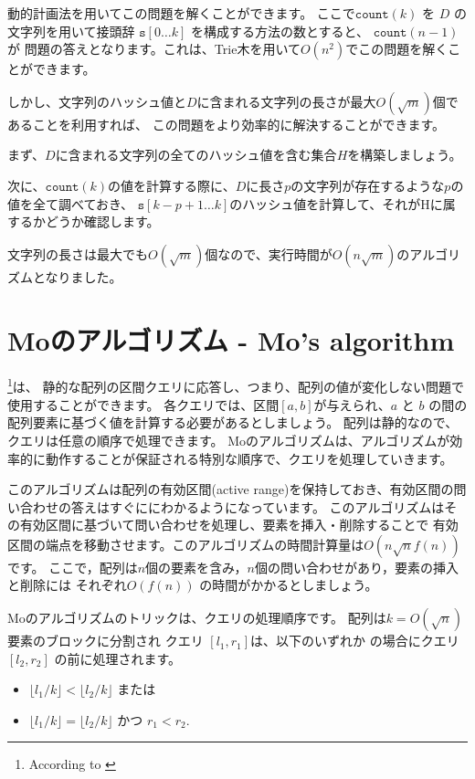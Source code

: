 動的計画法を用いてこの問題を解くことができます。
ここで$\texttt{count}(k)$ を $D$ の文字列を用いて接頭辞 $\texttt{s}[0 \ldots k]$ を構成する方法の数とすると、
$\texttt{count}(n-1)$が
問題の答えとなります。これは、Trie木を用いて$O(n^2)$でこの問題を解くことができます。

しかし、文字列のハッシュ値と$D$に含まれる文字列の長さが最大$O(\sqrt m)$個であることを利用すれば、
この問題をより効率的に解決することができます。

まず、$D$に含まれる文字列の全てのハッシュ値を含む集合$H$を構築しましょう。

次に、$\texttt{count}(k)$の値を計算する際に、$D$に長さ$p$の文字列が存在するような$p$の値を全て調べておき、
$\texttt{s}[k-p+1 \ldots k]$のハッシュ値を計算して、それがHに属するかどうか確認します。

文字列の長さは最大でも$O(\sqrt m)$個なので、実行時間が$O(n \sqrt m)$のアルゴリズムとなりました。

\section{Moのアルゴリズム - Mo's algorithm}


\footnote{According to \cite{cod15}}は、
静的な配列の区間クエリに応答し、つまり、配列の値が変化しない問題で使用することができます。
各クエリでは、区間$[a,b]$が与えられ、$a$ と $b$ の間の配列要素に基づく値を計算する必要があるとしましょう。
配列は静的なので、クエリは任意の順序で処理できます。
Moのアルゴリズムは、アルゴリズムが効率的に動作することが保証される特別な順序で、クエリを処理していきます。

このアルゴリズムは配列の有効区間(active range)を保持しておき、有効区間の問い合わせの答えはすぐににわかるようになっています。
このアルゴリズムはその有効区間に基づいて問い合わせを処理し、要素を挿入・削除することで
有効区間の端点を移動させます。このアルゴリズムの時間計算量は$O(n \sqrt n f(n))$ です。
ここで，配列は$n$個の要素を含み，$n$個の問い合わせがあり，要素の挿入と削除には それぞれ$O(f(n))$ の時間がかかるとしましょう。

Moのアルゴリズムのトリックは、クエリの処理順序です。
配列は$k=O(\sqrt n)$要素のブロックに分割され
クエリ $[l_1,r_1]$は、以下のいずれか の場合にクエリ$[l_2,r_2]$ の前に処理されます。

\begin{itemize}
\item $\lfloor l_1/k \rfloor < \lfloor l_2/k \rfloor$ または
\item $\lfloor l_1/k \rfloor = \lfloor l_2/k \rfloor$ かつ $r_1 < r_2$.
\end{itemize}

